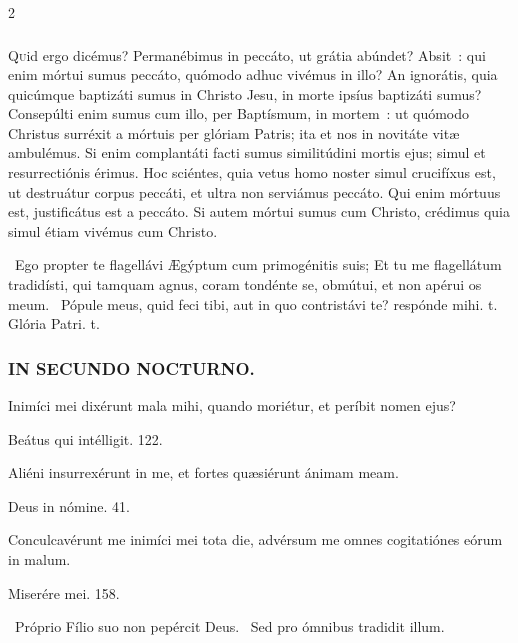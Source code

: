 \documentclass[9pt,twoside]{extarticle}
\begin{document}
\begin{multicols}{2}
{{\subsubsection*{\center{}}
\lettrine{Q}uid ergo dicémus? Permanébimus in peccáto, ut grátia abúndet? Absit~: qui enim mórtui sumus peccáto, quómodo adhuc vivémus in illo? An ignorátis, quia quicúmque baptizáti sumus in Christo Jesu, in morte ipsíus baptizáti sumus? Consepúlti enim sumus cum illo, per Baptísmum, in mortem~: ut quómodo Christus surréxit a mórtuis per glóriam Patris; ita et nos in novitáte vitæ ambulémus. Si enim complantáti facti sumus similitúdini mortis ejus; simul et resurrectiónis érimus. Hoc sciéntes, quia vetus homo noster simul crucifíxus est, ut destruátur corpus peccáti, et ultra non serviámus peccáto. Qui enim mórtuus est, justificátus est a peccáto. Si autem mórtui sumus cum Christo, crédimus quia simul étiam vivémus cum Christo.

\begin{tightlist}{}
\item {}~Ego propter te flagellávi Ægýptum cum primogénitis suis; \textred{*} Et tu me flagellátum tradidísti, qui tamquam agnus, coram tondénte se, obmútui, et non apérui os meum. ~Pópule meus, quid feci tibi, aut in quo contristávi te? respónde mihi. t.  Glória Patri. t.
\end{tightlist}

\subsubsection*{\center \textsc{IN SECUNDO NOCTURNO.}}
\begin{tightlist}{}
\item {} Inimíci mei dixérunt mala mihi, quando moriétur, et períbit nomen ejus?
\item {} Beátus qui intélligit. 122.
\item {} Aliéni insurrexérunt in me, et fortes quæsiérunt ánimam meam.
\item {} Deus in nómine. 41.
\item {} Conculcavérunt me inimíci mei tota die, advérsum me omnes cogitatiónes eórum in malum.
\item {} Miserére mei. 158.
\item {}~Próprio Fílio suo non pepércit Deus. ~Sed pro ómnibus tradidit illum.
\end{tightlist}

}}
\end{multicols}
\end{document}
